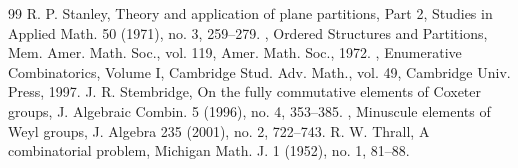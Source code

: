 \begin{thebibliography}{99}
 R. P. Stanley, Theory and application of plane partitions, Part 2, Studies in Applied Math. 50 (1971), no. 3, 259–279.
 , Ordered Structures and Partitions, Mem. Amer. Math. Soc., vol. 119, Amer. Math. Soc., 1972.
 , Enumerative Combinatorics, Volume I, Cambridge Stud. Adv. Math., vol. 49, Cambridge Univ. Press, 1997.
 J. R. Stembridge, On the fully commutative elements of Coxeter groups, J. Algebraic Combin. 5 (1996), no. 4, 353–385.
 , Minuscule elements of Weyl groups, J. Algebra 235 (2001), no. 2, 722–743.
 R. W. Thrall, A combinatorial problem, Michigan Math. J. 1 (1952), no. 1, 81–88.
\end{thebibliography}
